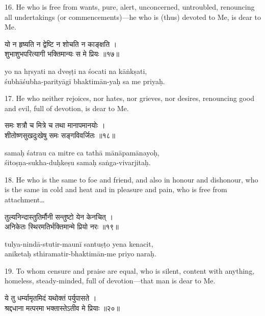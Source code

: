 16. He who is free from wants, pure, alert, unconcerned, untroubled, renouncing
all undertakings (or commencements)---he who is (thus) devoted to Me, is dear
to Me.

\begin{gitaverse}
यो न हृष्यति न द्वेष्टि न शोचति न काङ्क्षति । \\
शुभाशुभपरित्यागी भक्तिमान्यः स मे प्रियः ॥१७॥
\end{gitaverse}

\begin{transliteration}
yo na hṛsyati na dveṣṭi na śocati na kāṅkṣati, \\
śubhāśubha-parityāgī bhaktimān-yaḥ sa me priyaḥ.
\end{transliteration}

17. He who neither rejoices, nor hates, nor grieves, nor desires, renouncing
good and evil, full of devotion, is dear to Me.

\begin{gitaverse}
समः शत्रौ च मित्रे च तथा मानापमानयोः । \\
शीतोष्णसुखदुःखेषु समः सङ्गविवर्जितः ॥१८॥
\end{gitaverse}

\begin{transliteration}
samaḥ śatrau ca mitre ca tathā mānāpamānayoḥ, \\
śitoṣṇa-sukha-duḥkeṣu samaḥ saṅga-vivarjitaḥ.
\end{transliteration}

18. He who is the same to foe and friend, and also in honour and dishonour, who
is the same in cold and heat and in pleasure and pain, who is free from
attachment\ldots

\begin{gitaverse}
तुल्यनिन्दास्तुतिर्मौनी सन्तुष्टो येन केनचित् । \\
अनिकेतः स्थिरमतिर्भक्तिमान्मे प्रियो नरः ॥१९॥
\end{gitaverse}

\begin{transliteration}
tulya-nindā-stutir-maunī santuṣṭo yena kenacit, \\
aniketaḥ sthiramatir-bhaktimān-me priyo naraḥ.
\end{transliteration}

19. To whom censure and praise are equal, who is silent, content with anything,
homeless, steady-minded, full of devotion---that man is dear to Me.

\begin{gitaverse}
ये तु धर्म्यामृतमिदं यथोक्तं पर्युपासते । \\
श्रद्दधाना मत्परमा भक्तास्तेऽतीव मे प्रियाः ॥२०॥
\end{gitaverse}

